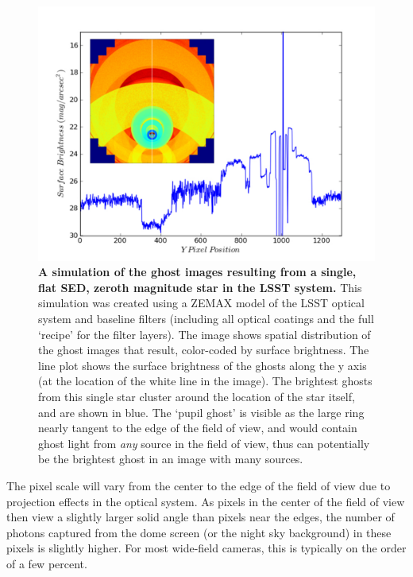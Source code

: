 \documentclass[12pt,preprint]{aastex}
\begin{document}
\begin{figure}[htbp]
\includegraphics[width=6in]{r-bandGhost}
\caption{ {\small
{\bf A simulation of the ghost images resulting from a single, flat
  SED, zeroth magnitude star in the LSST system.} This simulation was
created using a ZEMAX model of the
LSST optical system and baseline filters (including all optical
coatings and the full `recipe' for the filter layers). The image shows
spatial distribution of the ghost images that result, color-coded by
surface brightness. The line plot shows the surface brightness of the
ghosts along the y axis (at the location of the white line in the
image).  The brightest ghosts from this single star cluster around the
location of the star itself, and are shown in blue. The `pupil ghost'
is visible as the large ring nearly tangent to the edge of the field
of view, and would contain ghost light from {\it any} source in the
field of view, thus can potentially be the brightest ghost in an image
with many sources. }}
\label{fig:ghosts}
\end{figure}

\label{sec:pixscale}

The pixel scale will vary from the center to the edge of the field of
view due to projection effects in the optical system. As pixels in the
center of the field of view then view a slightly larger solid angle
than pixels near the edges, the number of photons captured from the
dome screen (or the night sky background) in these pixels is slightly
higher. For most wide-field cameras, this is typically on the order of
a few percent.
\end{document}

